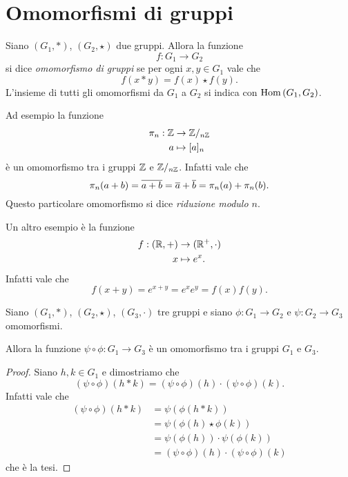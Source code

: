 \section{Omomorfismi di gruppi}

\begin{definition} \label{def:omo_gruppi}
    Siano $(G_1, *)$, $(G_2, \star)$ due gruppi. Allora la funzione \[
        f : G_1 \to G_2    
    \] si dice \emph{omomorfismo di gruppi} se per ogni $x, y \in G_1$ vale che \begin{equation}
        f(x * y) = f(x) \star f(y).
    \end{equation}
    L'insieme di tutti gli omomorfismi da $G_1$ a $G_2$ si indica con $\operatorname{Hom}\left(G_1, G_2\right)$.
\end{definition}

\begin{example}
    Ad esempio la funzione \begin{align*}
    \pi_n : \mathbb{Z} &\to \mathbb{Z}/_{n\mathbb{Z}}\\
    a &\mapsto [a]_n
\end{align*} è un omomorfismo tra i gruppi $\mathbb{Z}$ e $\mathbb{Z}/_{n\mathbb{Z}}$. Infatti vale che \[
    \pi_n(a + b) = \eqclass{a + b} = \eqclass a + \eqclass b = \pi_n(a) + \pi_n(b).
\] Questo particolare omomorfismo si dice \emph{riduzione modulo $n$}.
\end{example}

\begin{example}
    Un altro esempio è la funzione \begin{align*}
    f : (\mathbb{R}, +) &\to (\mathbb{R}^+, {\cdot})\\
    x &\mapsto e^x.
\end{align*} Infatti vale che \[
    f(x + y) = e^{x + y} = e^xe^y = f(x)f(y).    
\]
\end{example}

\begin{proposition}
     \label{prop:comp_omo}
    Siano $(G_1, *)$, $(G_2, \star)$, $(G_3, \cdot)$ tre gruppi e siano $\phi : G_1 \to G_2$ e $\psi : G_2 \to G_3$ omomorfismi.

    Allora la funzione $\psi \circ \phi : G_1 \to G_3$ è un omomorfismo tra i gruppi $G_1$ e $G_3$.
\end{proposition}
\begin{proof}
    Siano $h, k \in G_1$ e dimostriamo che \[
        (\psi \circ \phi)(h * k) = (\psi \circ \phi)(h) \cdot (\psi \circ \phi)(k).
    \] Infatti vale che
    \begin{align*}
        (\psi \circ \phi)(h * k) &= \psi(\phi(h * k)) \tag{$\phi$ omo.}\\
        &= \psi(\phi(h) \star \phi(k)) \tag{$\psi$ omo.}\\
        &= \psi(\phi(h)) \cdot \psi(\phi(k)) \\
        &= (\psi \circ \phi)(h) \cdot (\psi \circ \phi)(k)
    \end{align*}
    che è la tesi.
\end{proof}


